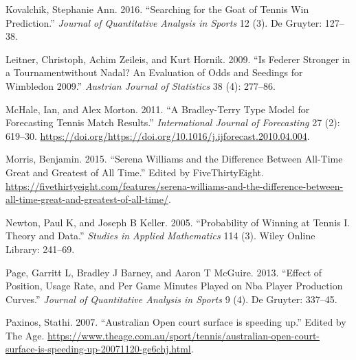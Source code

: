 \documentclass[]{article}
\begin{document}
\leavevmode\hypertarget{ref-kovalchik2016}{}%
Kovalchik, Stephanie Ann. 2016. ``Searching for the Goat of Tennis Win
Prediction.'' \emph{Journal of Quantitative Analysis in Sports} 12 (3).
De Gruyter: 127--38.

\leavevmode\hypertarget{ref-leitner2009}{}%
Leitner, Christoph, Achim Zeileis, and Kurt Hornik. 2009. ``Is Federer
Stronger in a Tournamentwithout Nadal? An Evaluation of Odds and
Seedings for Wimbledon 2009.'' \emph{Austrian Journal of Statistics} 38
(4): 277--86.

\leavevmode\hypertarget{ref-mchale2011}{}%
McHale, Ian, and Alex Morton. 2011. ``A Bradley-Terry Type Model for
Forecasting Tennis Match Results.'' \emph{International Journal of
Forecasting} 27 (2): 619--30.
\url{https://doi.org/https://doi.org/10.1016/j.ijforecast.2010.04.004}.

\leavevmode\hypertarget{ref-five2015}{}%
Morris, Benjamin. 2015. ``Serena Williams and the Difference Between
All-Time Great and Greatest of All Time.'' Edited by FiveThirtyEight.
\url{https://fivethirtyeight.com/features/serena-williams-and-the-difference-between-all-time-great-and-greatest-of-all-time/}.

\leavevmode\hypertarget{ref-newton2005}{}%
Newton, Paul K, and Joseph B Keller. 2005. ``Probability of Winning at
Tennis I. Theory and Data.'' \emph{Studies in Applied Mathematics} 114
(3). Wiley Online Library: 241--69.

\leavevmode\hypertarget{ref-page2013}{}%
Page, Garritt L, Bradley J Barney, and Aaron T McGuire. 2013. ``Effect
of Position, Usage Rate, and Per Game Minutes Played on Nba Player
Production Curves.'' \emph{Journal of Quantitative Analysis in Sports} 9
(4). De Gruyter: 337--45.

\leavevmode\hypertarget{ref-theage2007}{}%
Paxinos, Stathi. 2007. ``Australian Open court surface is speeding up.''
Edited by The Age.
\url{https://www.theage.com.au/sport/tennis/australian-open-court-surface-is-speeding-up-20071120-ge6chj.html}.
\end{document}
